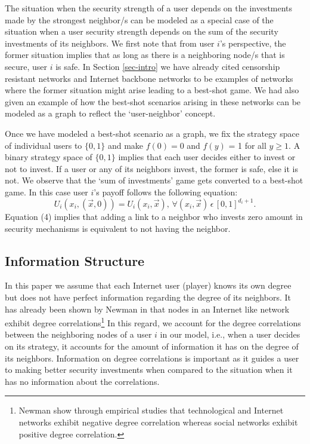 \documentclass[letterpaper,12pt,onecolumn, nodraft]{IEEEtran}
\begin{document}
The situation when the security strength of a user depends on the investments made by the strongest neighbor/s can be modeled as a special case of the situation when a user security strength depends on the sum of the security investments of its neighbors. We first note that from user $i$'s perspective, the former situation implies that as long as there is a neighboring node/s that is secure, user $i$ is safe. In Section \ref{sec-intro} we have already cited censorship resistant networks and Internet backbone networks to be examples of networks where the former situation might arise leading to a best-shot game. We had also given an example of how the best-shot scenarios arising in these networks can be modeled as a graph to reflect the `user-neighbor' concept.

Once we have modeled a best-shot scenario as a graph, we fix the strategy space of individual users to $\{0,1\}$ and make $f(0) = 0$ and $f(y)$ = 1 for all $y \ge 1$. A binary strategy space of $\{0,1\}$ implies that each user decides either to invest or not to invest. If a user or any of its neighbors invest, the former is safe, else it is not. We observe that the `sum of investments' game gets converted to a best-shot game. In this case user $i$'s payoff follows the following equation:
\begin{equation}
U_{i}(x_{i}, (\overrightarrow x,0)) = U_{i}(x_{i}, \overrightarrow x),\, \forall (x_{i}, \overrightarrow x)\,\epsilon\,[0,1]^{d_{i} + 1}. 
\end{equation}
Equation (4) implies that adding a link to a neighbor who invests zero amount in security mechanisms is equivalent to not having the neighbor.  

\subsection{Information Structure} \label{sec-is}
In this paper we assume that each Internet user (player) knows its own degree but does not have perfect information regarding the degree of its neighbors. It has already been shown by Newman in \cite{newman2} that nodes in an Internet like network exhibit degree correlations\footnote{Newman show through empirical studies that technological and Internet networks exhibit negative degree correlation whereas social networks exhibit positive degree correlation.} In this regard, we account for the degree correlations between the neighboring nodes of a user $i$ in our model, i.e., when a user decides on its strategy, it accounts for the amount of information it has on the degree of its neighbors. Information on degree correlations is important as it guides a user to making better security investments when compared to the situation when it has no information about the correlations.   
\end{document}
